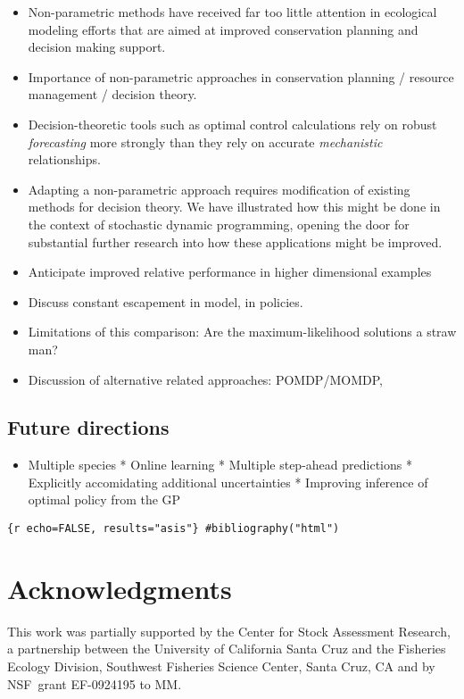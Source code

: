 \documentclass[author-year, review]{elsarticle} %
\begin{document}
\begin{itemize}
\item
  Non-parametric methods have received far too little attention in
  ecological modeling efforts that are aimed at improved conservation
  planning and decision making support.
\item
  Importance of non-parametric approaches in conservation planning /
  resource management / decision theory.
\item
  Decision-theoretic tools such as optimal control calculations rely on
  robust \emph{forecasting} more strongly than they rely on accurate
  \emph{mechanistic} relationships.
\item
  Adapting a non-parametric approach requires modification of existing
  methods for decision theory. We have illustrated how this might be
  done in the context of stochastic dynamic programming, opening the
  door for substantial further research into how these applications
  might be improved.
\item
  Anticipate improved relative performance in higher dimensional
  examples
\item
  Discuss constant escapement in model, in policies.
\item
  Limitations of this comparison: Are the maximum-likelihood solutions a
  straw man?
\item
  Discussion of alternative related approaches: POMDP/MOMDP,
\end{itemize}

\subsection{Future directions}

\begin{itemize}
\itemsep1pt\parskip0pt
\item
  Multiple species * Online learning * Multiple step-ahead predictions *
  Explicitly accomidating additional uncertainties * Improving inference
  of optimal policy from the GP
\end{itemize}

\texttt{\{r echo=FALSE, results="asis"\} \#bibliography("html")}

\section{Acknowledgments}

This work was partially supported by the Center for Stock Assessment
Research, a partnership between the University of California Santa Cruz
and the Fisheries Ecology Division, Southwest Fisheries Science Center,
Santa Cruz, CA and by NSF~grant EF-0924195 to MM.
\end{document}
